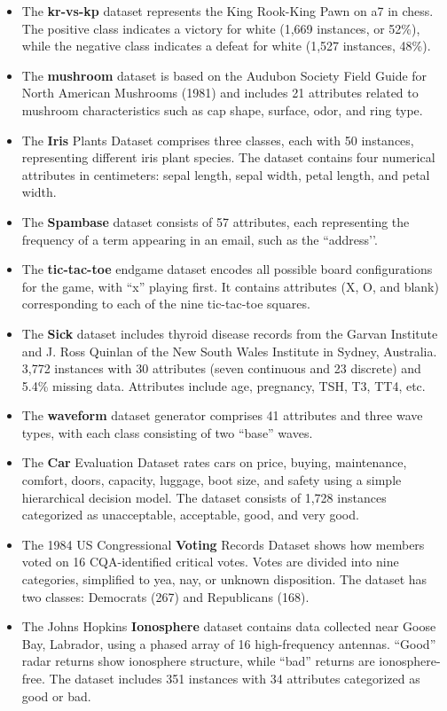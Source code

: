 %
\begin{itemize}
    \item The \textbf{kr-vs-kp} dataset represents the King Rook-King Pawn on a7 in chess. The positive class indicates a victory for white (1,669 instances, or 52\%), while the negative class indicates a defeat for white (1,527 instances, 48\%).
    \item The \textbf{mushroom} dataset is based on the Audubon Society Field Guide for North American Mushrooms (1981) and includes 21 attributes related to mushroom characteristics such as cap shape, surface, odor, and ring type.
    \item The \textbf{Iris} Plants Dataset comprises three classes, each with 50 instances, representing different iris plant species. The dataset contains four numerical attributes in centimeters: sepal length, sepal width, petal length, and petal width.
    \item The \textbf{Spambase} dataset consists of 57 attributes, each representing the frequency of a term appearing in an email, such as the ``address’’.
    \item The \textbf{tic-tac-toe} endgame dataset encodes all possible board configurations for the game, with ``x'' playing first. It contains attributes (X, O, and blank) corresponding to each of the nine tic-tac-toe squares.
    \item The \textbf{Sick} dataset includes thyroid disease records from the Garvan Institute and J. Ross Quinlan of the New South Wales Institute in Sydney, Australia. 3,772 instances with 30 attributes (seven continuous and 23 discrete) and 5.4\% missing data. Attributes include age, pregnancy, TSH, T3, TT4, etc.
    \item The \textbf{waveform} dataset generator comprises 41 attributes and three wave types, with each class consisting of two ``base'' waves.
    \item The \textbf{Car} Evaluation Dataset rates cars on price, buying, maintenance, comfort, doors, capacity, luggage, boot size, and safety using a simple hierarchical decision model. The dataset consists of 1,728 instances categorized as unacceptable, acceptable, good, and very good.
    \item The 1984 US Congressional \textbf{Voting} Records Dataset shows how members voted on 16 CQA-identified critical votes. Votes are divided into nine categories, simplified to yea, nay, or unknown disposition. The dataset has two classes: Democrats (267) and Republicans (168).
    \item The Johns Hopkins \textbf{Ionosphere} dataset contains data collected near Goose Bay, Labrador, using a phased array of 16 high-frequency antennas. ``Good'' radar returns show ionosphere structure, while ``bad'' returns are ionosphere-free. The dataset includes 351 instances with 34 attributes categorized as good or bad.
\end{itemize}

